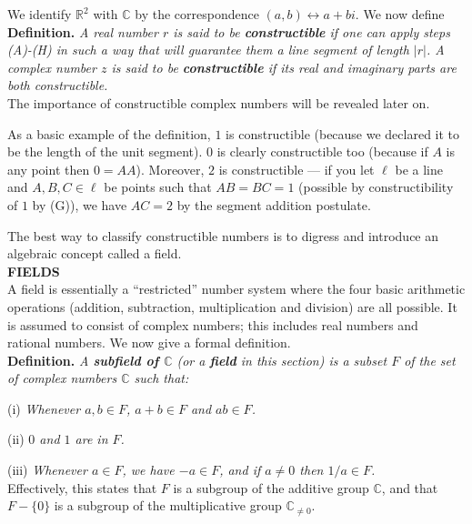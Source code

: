 \documentclass[leqno]{book}
\begin{document}
We identify $\mathbb R^2$ with $\mathbb C$ by the correspondence $(a,b)\leftrightarrow a+bi$.  We now define\\

\noindent\textbf{Definition.} \emph{A real number $r$ is said to be \textbf{constructible} if one can apply steps (A)-(H) in such a way that will guarantee them a line segment of length $|r|$.  A complex number $z$ is said to be \textbf{constructible} if its real and imaginary parts are both constructible.}\\

\noindent The importance of constructible complex numbers will be revealed later on.

As a basic example of the definition, $1$ is constructible (because we declared it to be the length of the unit segment).  $0$ is clearly constructible too (because if $A$ is any point then $0=AA$).  Moreover, $2$ is constructible \---- if you let $\ell$ be a line and $A,B,C\in\ell$ be points such that $AB=BC=1$ (possible by constructibility of $1$ by (G)), we have $AC=2$ by the segment addition postulate.

The best way to classify constructible numbers is to digress and introduce an algebraic concept called a field.\\

\noindent\textbf{FIELDS}\\

\noindent A field is essentially a ``restricted'' number system where the four basic arithmetic operations (addition, subtraction, multiplication and division) are all possible.  It is assumed to consist of complex numbers; this includes real numbers and rational numbers.  We now give a formal definition.\\

\noindent\textbf{Definition.} \emph{A \textbf{subfield of $\mathbb C$} (or a \textbf{field} in this section) is a subset $F$ of the set of complex numbers $\mathbb C$ such that:}

(i) \emph{Whenever $a,b\in F$, $a+b\in F$ and $ab\in F$.}

(ii) \emph{$0$ and $1$ are in $F$.}

(iii) \emph{Whenever $a\in F$, we have $-a\in F$, and if $a\ne 0$ then $1/a\in F$.}\\

\noindent Effectively, this states that $F$ is a subgroup of the additive group $\mathbb C$, and that $F-\{0\}$ is a subgroup of the multiplicative group $\mathbb C_{\ne 0}$.
\end{document}
